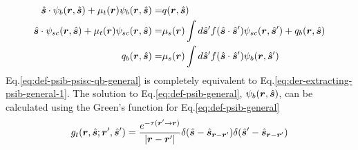 \documentclass [10pt,letterpaper]{article}
\newcommand{\unitvectorsym}[1]{\hat{\vectorsym{#1}}}
\begin{document}
\begin{subequations} \label{eq:def-psib-psisc-qb-general}
	\begin{align} 
		\unitvectorsym{s}
		\cdot
		\psi_b(\vectorsym{r},\unitvectorsym{s})
		+
		\mu_t(\vectorsym{r})
		\psi_b(\vectorsym{r},\unitvectorsym{s})
		=&
		q(\vectorsym{r},\unitvectorsym{s})
		\label{eq:def-psib-general}
		\\ 
		\unitvectorsym{s}
		\cdot
		\psi_{sc}(\vectorsym{r},\unitvectorsym{s})
		+
		\mu_t(\vectorsym{r})
		\psi_{sc}(\vectorsym{r},\unitvectorsym{s})
		=&
		\mu_s(\vectorsym{r})
		\int d\unitvectorsym{s}^\prime
		f(\unitvectorsym{s}\cdot\unitvectorsym{s}^\prime)
		\psi_{sc}(\vectorsym{r},\unitvectorsym{s}^\prime) 
		+
		q_b(\vectorsym{r},\unitvectorsym{s})
		\label{eq:def-psisc-general}
		\\
		q_b(\vectorsym{r},\unitvectorsym{s})
		=&
		\mu_s(\vectorsym{r})
		\int d\unitvectorsym{s}^\prime
		f(\unitvectorsym{s}\cdot\unitvectorsym{s}^\prime)
		\psi_{b}(\vectorsym{r},\unitvectorsym{s}^\prime) 
		\label{eq:def-qb-general}
	\end{align}
\end{subequations}
Eq.\eqref{eq:def-psib-psisc-qb-general} is completely equivalent to Eq.\eqref{eq:der-extracting-psib-general-1}.
The solution to Eq.\eqref{eq:def-psib-general}, $\psi_b(\vectorsym{r},\unitvectorsym{s})$, can be calculated using the Green's function for Eq.\eqref{eq:def-psib-general}
\begin{equation} \label{eq:exp-gft-general}
	g_t(\vectorsym{r},\unitvectorsym{s};\vectorsym{r}^\prime,\unitvectorsym{s}^\prime)
	=
	\frac
	{e^{-\tau(\vectorsym{r}^\prime\to\vectorsym{r})}}
	{\lvert \vectorsym{r}-\vectorsym{r}^\prime \rvert}
	\delta(\unitvectorsym{s}-\unitvectorsym{s}_{\vectorsym{r}-\vectorsym{r}^\prime})
	\delta(\unitvectorsym{s}^\prime-\unitvectorsym{s}_{\vectorsym{r}-\vectorsym{r}^\prime})
\end{equation}
\end{document}
